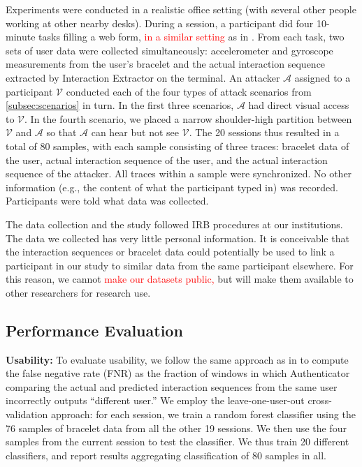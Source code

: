 \documentclass[conference]{IEEEtran}
\newcommand{\attacker}{$\mathcal{A}$\xspace}
\newcommand{\victim}{$\mathcal{V}$\xspace}
\newcommand\changeMika[1]{\textcolor{red}{#1}}
\newcommand\changeAsokan[1]{\textcolor{red}{#1}}
\newcommand\changeMika[1]{{#1}}
\newcommand\changeAsokan[1]{{#1}}
\begin{document}
Experiments were conducted in a realistic office setting (with several
other people working at other nearby desks). During a session, a participant did four
10-minute tasks filling a web form, \changeMika{in a similar setting} as in
\cite{mare2014zebra}. From each task, two sets of user data were collected
simultaneously: accelerometer and gyroscope measurements from the user's
bracelet and the actual interaction sequence extracted by Interaction Extractor
on the terminal.  An attacker \attacker assigned to a participant \victim
conducted each of the four types of attack scenarios from
\ref{subsec:scenarios} in turn. In the first three scenarios, \attacker had direct visual
access to \victim. In the fourth scenario, we placed a narrow shoulder-high partition
between \victim and \attacker so that \attacker can hear but not see \victim.
The 20 sessions thus resulted in a total of 80 samples, with each sample
consisting of three traces: bracelet data of the user, actual interaction
sequence of the user, and the actual interaction sequence of the attacker. All
traces within a sample were synchronized. No other information (e.g., the
content of what the participant typed in) was recorded. Participants were told
what data was collected.


The data collection and the study followed IRB procedures at our institutions.
The data we collected has very little personal information. It is
conceivable that the interaction sequences or bracelet data could potentially
be used to link a participant in our study to similar data from the same
participant elsewhere. For this reason, we cannot \changeAsokan{make our datasets 
 public,} but will make them available to other researchers for research use.








 








\subsection{Performance Evaluation}
\label{sec:performance_evaluation}

\textbf{Usability:} To evaluate {usability}, we follow the same approach as in \cite{mare2014zebra} to compute the false negative rate (FNR) as the fraction of windows in which Authenticator comparing the actual and predicted interaction sequences from the same user incorrectly outputs ``different user.''
We 
employ the leave-one-user-out cross-validation approach: for each session, 
we train a random forest classifier using the 76 samples of bracelet data from all the other 19 sessions. We then use the four samples from the current session to test the classifier. We thus train 20 different classifiers, and report results aggregating classification of 80 samples in all.
\end{document}
